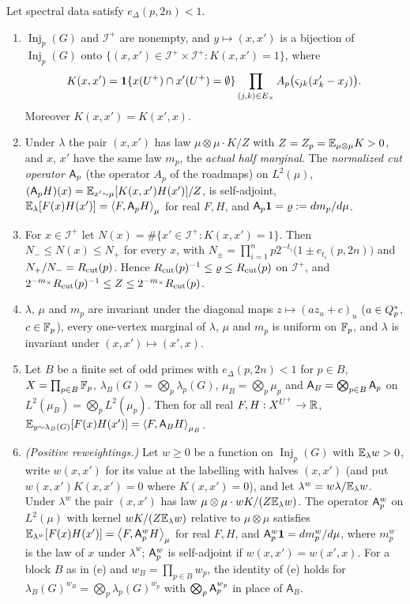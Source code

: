 \begin{lemma}\label{lem:spec:cutkernel}
Let spectral data satisfy $e_\Delta(p,2n)<1$.
\begin{enumerate}[label=\textup{(\alph*)}]
\item $\operatorname{Inj}_p(G)$ and $\mathcal I^+$ are nonempty, and
  $y\mapsto(x,x')$ is a bijection of $\operatorname{Inj}_p(G)$ onto
  $\{(x,x')\in\mathcal I^+\times\mathcal I^+:K(x,x')=1\}$, where
  \begin{equation}\label{eq:spec:K}
    K(x,x')=\mathbf 1\{x(U^+)\cap x'(U^+)=\emptyset\}\prod_{(j,k)\in E_\times}
    A_{p}\big(\varsigma_{jk}(x'_k-x_j)\big).
  \end{equation}
  Moreover $K(x,x')=K(x',x)$.
\item Under $\lambda$ the pair $(x,x')$ has law $\mu\otimes\mu\cdot K/Z$ with
  $Z=Z_p=\mathbb E_{\mu\otimes\mu}K>0$, and $x$, $x'$ have the same law $m_p$, the
  \emph{actual half marginal}. The \emph{normalized cut operator} $\mathsf A_p$ (the operator $A_p$ of the roadmaps) on
  $L^2(\mu)$, $(\mathsf A_p H)(x)=\mathbb E_{x'\sim\mu}[K(x,x')H(x')]/Z$, is self-adjoint,
  $\mathbb E_\lambda[F(x)H(x')]=\left\langle F,\mathsf A_p H\right\rangle_\mu$ for real $F,H$, and
  $\mathsf A_p\mathbf 1=\varrho:=dm_p/d\mu$.
\item For $x\in\mathcal I^+$ let $N(x)=\#\{x'\in\mathcal I^+:K(x,x')=1\}$. Then
  $N_-\le N(x)\le N_+$ for every $x$, with
  $N_\pm=\prod_{i=1}^np2^{-t_i}\big(1\pm e_{t_i}(p,2n)\big)$ and
  $N_+/N_-=R_{\mathrm{cut}}(p)$. Hence $R_{\mathrm{cut}}(p)^{-1}\le\varrho\le R_{\mathrm{cut}}(p)$ on
  $\mathcal I^+$, and $2^{-m_\times}R_{\mathrm{cut}}(p)^{-1}\le Z\le2^{-m_\times}R_{\mathrm{cut}}(p)$.
\item $\lambda$, $\mu$ and $m_p$ are invariant under the diagonal maps
  $z\mapsto(az_u+c)_u$ ($a\in Q_{p}^{*}$, $c\in\mathbb F_p$), every one-vertex marginal of
  $\lambda$, $\mu$ and $m_p$ is uniform on $\mathbb F_p$, and $\lambda$ is invariant
  under $(x,x')\mapsto(x',x)$.
\item Let $B$ be a finite set of odd primes with $e_\Delta(p,2n)<1$ for
  $p\in B$, $X=\prod_{p\in B}\mathbb F_p$, $\lambda_B(G)=\bigotimes_p\lambda_p(G)$,
  $\mu_B=\bigotimes_p\mu_p$ and $\mathsf A_B=\bigotimes_{p\in B}\mathsf A_p$ on
  $L^2(\mu_B)=\bigotimes_pL^2(\mu_p)$. Then for all real
  $F,H:X^{U^+}\to\mathbb R$, $\mathbb E_{y\sim\lambda_B(G)}[F(x)H(x')]=\left\langle F,\mathsf
  A_BH\right\rangle_{\mu_B}$.
\item \emph{(Positive reweightings.)} Let $w\ge0$ be a function on
  $\operatorname{Inj}_p(G)$ with $\mathbb E_\lambda w>0$, write $w(x,x')$ for its value
  at the labelling with halves $(x,x')$ (and put $w(x,x')K(x,x')=0$ where
  $K(x,x')=0$), and let $\lambda^w=w\lambda/\mathbb E_\lambda w$. Under $\lambda^w$ the
  pair $(x,x')$ has law $\mu\otimes\mu\cdot wK/(Z\mathbb E_\lambda w)$. The operator
  $\mathsf A_p^w$ on $L^2(\mu)$ with kernel $wK/(Z\mathbb E_\lambda w)$ relative to
  $\mu\otimes\mu$ satisfies $\mathbb E_{\lambda^w}[F(x)H(x')]=\left\langle F,\mathsf A_p^wH\right\rangle_\mu$ for
  real $F,H$, and $\mathsf A_p^w\mathbf 1=dm^w_p/d\mu$, where $m^w_p$ is the law of $x$ under
  $\lambda^w$; $\mathsf A_p^w$ is self-adjoint if $w(x,x')=w(x',x)$. For a block $B$ as
  in (e) and $w_B=\prod_{p\in B}w_p$, the identity of (e) holds for
  $\lambda_B(G)^{w_B}=\bigotimes_p\lambda_p(G)^{w_p}$ with
  $\bigotimes_p\mathsf A_p^{w_p}$ in place of $\mathsf A_B$.
\end{enumerate}
\end{lemma}

